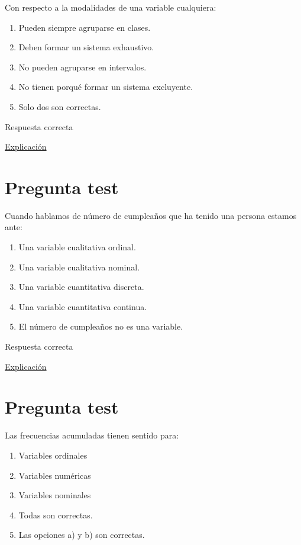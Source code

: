 \documentclass[
]{book}
\providecommand{\tightlist}{%
  \setlength{\itemsep}{0pt}\setlength{\parskip}{0pt}}
\begin{document}
Con respecto a la modalidades de una variable cualquiera:

\begin{enumerate}
\def\labelenumi{\alph{enumi})}
\tightlist
\item
  Pueden siempre agruparse en clases.
\item
  Deben formar un sistema exhaustivo.
\item
  No pueden agruparse en intervalos.
\item
  No tienen porqué formar un sistema excluyente.
\item
  Solo dos son correctas.
\end{enumerate}

Respuesta correcta

\href{https://1fjmanzano.github.io/bioestadistica/tipos-de-variables.html}{Explicación}

\hypertarget{pregunta-test-18}{%
\section{Pregunta test}\label{pregunta-test-18}}

Cuando hablamos de número de cumpleaños que ha tenido una persona estamos ante:

\begin{enumerate}
\def\labelenumi{\alph{enumi})}
\tightlist
\item
  Una variable cualitativa ordinal.
\item
  Una variable cualitativa nominal.
\item
  Una variable cuantitativa discreta.
\item
  Una variable cuantitativa continua.
\item
  El número de cumpleaños no es una variable.
\end{enumerate}

Respuesta correcta

\href{https://1fjmanzano.github.io/bioestadistica/tipos-de-variables.html}{Explicación}

\hypertarget{pregunta-test-19}{%
\section{Pregunta test}\label{pregunta-test-19}}

Las frecuencias acumuladas tienen sentido para:

\begin{enumerate}
\def\labelenumi{\alph{enumi})}
\tightlist
\item
  Variables ordinales
\item
  Variables numéricas
\item
  Variables nominales
\item
  Todas son correctas.
\item
  Las opciones a) y b) son correctas.
\end{enumerate}
\end{document}
